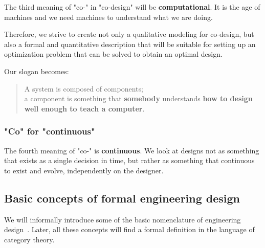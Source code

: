 The third meaning of "co-" in "co-design" will be \textbf{computational}. It is the age of machines and we need
 machines to understand what we are doing. 

Therefore, we strive to create not only a qualitative modeling for co-design, but also a formal and quantitative description that will be suitable for setting up an optimization problem that can be solved to obtain an optimal design.

Our slogan becomes:

\begin{quote}
    A system is composed of components;\\
      a component is something that \textbf{somebody} understands
      \textbf{how to design} \textbf{well enough to teach a computer}.
\end{quote}


\subsubsection{"Co" for "continuous"}

The fourth meaning of "co-" is \textbf{continuous}. We look at designs not as something that exists
as a single decision in time, but rather as something that continuous to exist and evolve, independently 
on the designer.






\subsection{Basic concepts of formal engineering design}

We will informally introduce some of the basic nomenclature of engineering
design~\cite{antonsson2005formal,deweck2011}. Later, all these concepts will find a formal
definition in the language of category theory.

